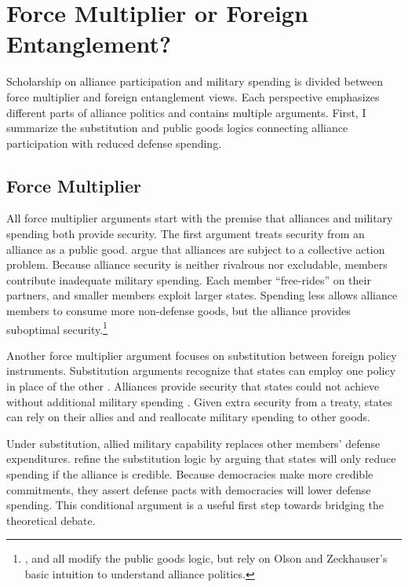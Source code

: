 \documentclass[12pt]{article}
\begin{document}
\section{Force Multiplier or Foreign Entanglement?}


Scholarship on alliance participation and military spending is divided between force multiplier and foreign entanglement views.
Each perspective emphasizes different parts of alliance politics and contains multiple arguments.  
First, I summarize the substitution and public goods logics connecting alliance participation with reduced defense spending. 


\subsection{Force Multiplier} 


All force multiplier arguments start with the premise that alliances and military spending both provide security.
The first argument treats security from an alliance as a public good. 
\citet{OlsonZeckhauser1966} argue that alliances are subject to a collective action problem.
Because alliance security is neither rivalrous nor excludable, members contribute inadequate military spending. 
Each member ``free-rides'' on their partners, and smaller members exploit larger states. 
Spending less allows alliance members to consume more non-defense goods, but the alliance provides suboptimal security.\footnote{\citet{SandlerForbes1980}, \citet{Oneal1990} and \citet{SandlerHartley2001} all modify the public goods logic, but rely on Olson and Zeckhauser's basic intuition to understand alliance politics.} 


Another force multiplier argument focuses on substitution between foreign policy instruments.
Substitution arguments recognize that states can employ one policy in place of the other \citep{MostStarr1989}.  
Alliances provide security that states could not achieve without additional military spending \citep{Morrow1993, Conybeare1994}. 
Given extra security from a treaty, states can rely on their allies and and reallocate military spending to other goods. 


Under substitution, allied military capability replaces other members' defense expenditures. 
\citet{DigiuseppePoast2016} refine the substitution logic by arguing that states will only reduce spending if the alliance is credible. 
Because democracies make more credible commitments, they assert defense pacts with democracies will lower defense spending.
This conditional argument is a useful first step towards bridging the theoretical debate. 
\end{document}
